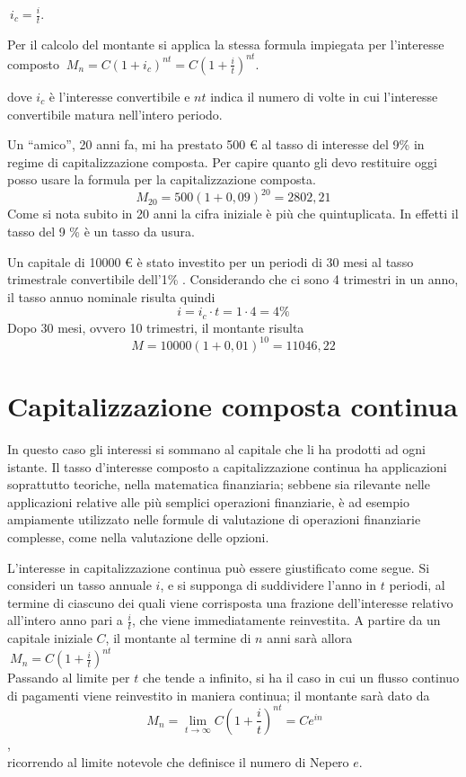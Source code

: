$\ i_c = \frac{i}{t}$.

Per il calcolo del montante si applica la stessa formula impiegata per 
l'interesse composto
$\ M_n = C (1+i_c)^{nt} = C \left(1+\frac{i}{t}\right)^{nt}$.

dove $i_c$ è l'interesse convertibile e $nt$ indica il numero di volte in cui 
l'interesse convertibile matura nell'intero periodo.

\begin{exrig}
\begin{esempio}
Un ``amico'', 20 anni fa, mi ha prestato 500 € al tasso di interesse del 9\% in 
regime di capitalizzazione composta. Per capire quanto gli devo restituire oggi 
posso usare la formula per la capitalizzazione composta.
$$M_{20} = 500(1+0,09)^{20} = 2802,21$$ 
Come si nota subito in 20 anni la cifra iniziale è più che quintuplicata. In 
effetti il tasso del 9 \% è un tasso da usura. 
\end{esempio}
\begin{esempio}
Un capitale di 10000 € è stato investito per un periodi di 30 mesi al tasso 
trimestrale convertibile dell'1\% . Considerando che ci sono 4 trimestri in un 
anno, il tasso annuo nominale risulta quindi
$$i=i_c\cdot t=1\cdot 4=4\%$$
Dopo 30 mesi, ovvero 10 trimestri, il montante risulta
$$M=10000(1+0,01)^{10}=11046,22$$
\end{esempio}
\end{exrig}

\section{Capitalizzazione composta continua}

In questo caso gli interessi si sommano al capitale che li ha prodotti ad ogni 
istante. Il tasso d'interesse composto a capitalizzazione continua ha 
applicazioni soprattutto teoriche, nella matematica finanziaria; sebbene sia 
rilevante nelle applicazioni relative alle più semplici operazioni finanziarie, 
è ad esempio ampiamente utilizzato nelle formule di valutazione di operazioni 
finanziarie complesse, come nella valutazione delle opzioni.

L'interesse in capitalizzazione continua può essere giustificato come segue. Si 
consideri un tasso annuale $i$, e si supponga di suddividere l'anno in $t$ 
periodi, al termine di ciascuno dei quali viene corrisposta una frazione 
dell'interesse relativo all'intero anno pari a $\frac{i}{t}$, che viene 
immediatamente reinvestita. A partire da un capitale iniziale $C$, il montante 
al termine di $n$ anni sarà allora
\\[4pt]
$\ M_n=C\left(1+\frac{i}{t}\right)^{nt}$
\\[4pt]
Passando al limite per $t$ che tende a infinito, si ha il caso in cui un flusso 
continuo di pagamenti viene reinvestito in maniera continua; il montante sarà 
dato da
\\[4pt]
$$\ M_n = \lim_{t\to\infty} C\left(1+\frac{i}{t}\right)^{nt} = Ce^{in}$$,
\\[4pt]
ricorrendo al limite notevole che definisce il numero di Nepero $e$.

